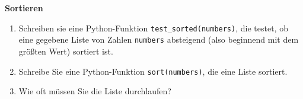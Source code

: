 \textbf{Sortieren}
\begin{enumerate}
	\item Schreiben sie eine Python-Funktion \verb|test_sorted(numbers)|, die testet, ob eine gegebene Liste von Zahlen \verb|numbers| absteigend (also beginnend mit dem größten Wert) sortiert ist.
	\item Schreibe Sie eine Python-Funktion \verb|sort(numbers)|, die eine Liste sortiert.
	\item  Wie oft müssen Sie die Liste durchlaufen?	
\end{enumerate}